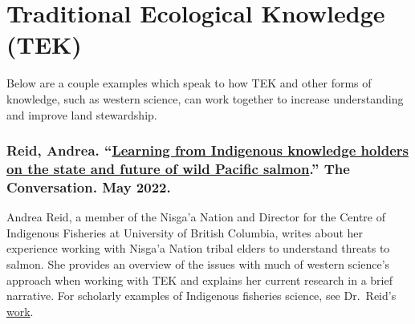 \documentclass[
]{book}
\begin{document}
\hypertarget{traditional-ecological-knowledge-tek}{%
\section{Traditional Ecological Knowledge (TEK)}\label{traditional-ecological-knowledge-tek}}

Below are a couple examples which speak to how TEK and other forms of knowledge, such as western science, can work together to increase understanding and improve land stewardship.

\hypertarget{reid-andrea.-learning-from-indigenous-knowledge-holders-on-the-state-and-future-of-wild-pacific-salmon.-the-conversation.-may-2022.}{%
\subsubsection*{\texorpdfstring{Reid, Andrea. ``\href{https://theconversation.com/learning-from-indigenous-knowledge-holders-on-the-state-and-future-of-wild-pacific-salmon-182411}{Learning from Indigenous knowledge holders on the state and future of wild Pacific salmon}.'' The Conversation. May 2022.}{Reid, Andrea. ``Learning from Indigenous knowledge holders on the state and future of wild Pacific salmon.'' The Conversation. May 2022.}}\label{reid-andrea.-learning-from-indigenous-knowledge-holders-on-the-state-and-future-of-wild-pacific-salmon.-the-conversation.-may-2022.}}

Andrea Reid, a member of the Nisga'a Nation and Director for the Centre of Indigenous Fisheries at University of British Columbia, writes about her experience working with Nisga'a Nation tribal elders to understand threats to salmon. She provides an overview of the issues with much of western science's approach when working with TEK and explains her current research in a brief narrative. For scholarly examples of Indigenous fisheries science, see Dr.~Reid's \href{https://scholar.google.com/citations?hl=en\&user=WWdYxJgAAAAJ}{work}.
\end{document}
